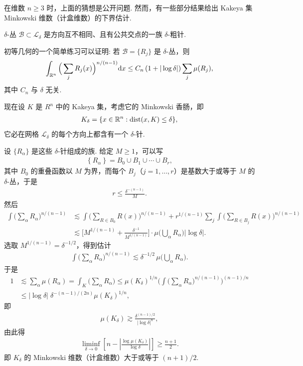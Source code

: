在维数 $n \geq 3$ 时，上面的猜想是公开问题. 然而，有一些部分结果给出 Kakeya 集 Minkowski 维数（计盒维数）的下界估计.

\begin{definition}\label{def:3.14}
$\delta$-丛 $\mathcal{B} \subset \mathcal{L}_\delta$ 是方向互不相同、且有公共交点的一族 $\delta$-粗针.
\end{definition}

初等几何的一个简单练习可以证明: 若 $\mathcal{B} = \{R_j\}$ 是 $\delta$-丛，则
\begin{align*}
  \int_{\mathbb{R}^{n}}\Big(\sum_{j}R_{j}(x)\Big)^{n/(n-1)}\mathrm{d}x
  \leq C_{n}\left(1+|\log\delta|\right)\sum_{j}\mu(R_{j}),
\end{align*}
其中 $C_{n}$ 与 $\delta$ 无关.

现在设 $K$ 是 $R^n$ 中的 Kakeya 集，考虑它的 Minkowski 香肠，即
\begin{align*}
  K_{\delta}=\{x\in\mathbb{R}^{n}:\operatorname{dist}(x,K)\leq\delta\},
\end{align*}
它必在网格 $\mathcal{L}_{\delta}$ 的每个方向上都含有一个 $\delta$-针.

设 $\{R_\alpha\}$ 是这些 $\delta$-针组成的族. 给定 $M \geq 1$，可以写
\begin{align*}
  \left\{R_{\alpha}\right\}=B_{0}\cup B_{1}\cup\cdots\cup B_{r},
\end{align*}
其中 $B_0$ 的重叠函数以 $M$ 为界，而每个 $B_j$（$j = 1, \ldots, r$）是基数大于或等于 $M$ 的 $\delta$-丛，于是
\begin{align*}
  r\leq\frac{\delta^{-(n-1)}}{M}.
\end{align*}
然后
\begin{align*}
  \int\Big(\sum_{\alpha}R_{\alpha}\Big)^{n/(n-1)}
  &\lesssim\int\Big(\sum_{R\in B_{0}}R(x)\Big)^{n/(n-1)}
   +r^{1/(n-1)}\sum_{j}\int\Big(\sum_{R\in B_{j}}R(x)\Big)^{n/(n-1)}\\
  &\lesssim\Big[M^{1/(n-1)}+\frac{\delta^{-1}}{M^{1/(n-1)}}\Big]\cdot\mu\Big(\bigcup_{\alpha}R_{\alpha}\Big)|\log\delta|.
\end{align*}
选取 $M^{1/(n-1)} = \delta^{-1/2}$，得到估计
\begin{align*}
  \int\Big(\sum_{\alpha}R_{\alpha}\Big)^{n/(n-1)}\lesssim\delta^{-1/2}\,\mu\Big(\bigcup_{\alpha}R_{\alpha}\Big).
\end{align*}
于是
\begin{align*}
  1
  &\lesssim\sum_{\alpha}\mu(R_{\alpha})
  =\int_{K}\Big(\sum_{\alpha}R_{\alpha}\Big)
  \leq\mu(K_{\delta})^{1/n}\Big(\int\Big(\sum_{\alpha}R_{\alpha}\Big)^{n/(n-1)}\Big)^{(n-1)/n}\\
  &\leq|\log\delta|\;\delta^{-(n-1)/(2n)}\mu(K_{\delta})^{1/n},
\end{align*}
即
\begin{align*}
  \mu(K_{\delta})\gtrsim\frac{\delta^{(n-1)/2}}{|\log\delta|^{n}},
\end{align*}
由此得
\begin{align*}
  \liminf_{\delta\to 0}\left[n-\left|\frac{\log\mu(K_\delta)}{\log\delta}\right|\right]\geq\frac{n+1}{2}.
\end{align*}
即 $K_{\delta}$ 的 Minkowski 维数（计盒维数）大于或等于 $(n+1)/2$.

